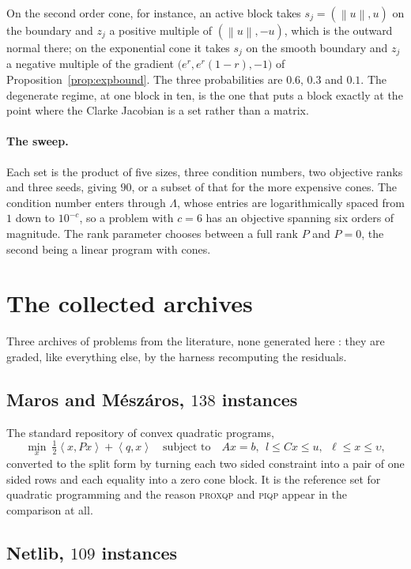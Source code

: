 \documentclass[a4paper,11pt]{book}
\theoremstyle{plain}
\theoremstyle{definition}
\theoremstyle{remark}
\numberwithin{equation}{chapter}
\numberwithin{algorithm}{chapter}
\newcommand{\norm}[1]{\left\|#1\right\|}
\newcommand{\inner}[2]{\left\langle #1, #2 \right\rangle}
\begin{document}
	On the second order cone, for instance, an active block takes
	$s_j=(\norm{u},u)$ on the boundary and $z_j$ a positive multiple of
	$(\norm{u},-u)$, which is the outward normal there; on the exponential cone
	it takes $s_j$ on the smooth boundary and $z_j$ a negative multiple of the
	gradient $\bigl(e^{r},e^{r}(1-r),-1\bigr)$ of Proposition~\ref{prop:expbound}.
	The three probabilities are $0.6$, $0.3$ and $0.1$. The degenerate regime, at
	one block in ten, is the one that puts a block
	exactly at the point where the Clarke Jacobian is a set rather than a matrix.

	\paragraph{The sweep.}
	Each set is the product of five sizes, three condition numbers, two objective
	ranks and three seeds, giving $90$, or a subset of that for the more expensive
	cones. The condition number enters through $\Lambda$, whose entries are
	logarithmically spaced from $1$ down to $10^{-c}$, so a problem with $c=6$
	has an objective spanning six orders of magnitude. The rank parameter chooses
	between a full rank $P$ and $P=0$, the second being a linear program with
	cones.

	\section{The collected archives}

	Three archives of problems from the literature, none generated here : they are graded, like everything else, by the harness
	recomputing the residuals.

	\subsection{Maros and M\'esz\'aros, $138$ instances}

	The standard repository of convex quadratic programs,
	\[
	\min_x\ \tfrac12\inner{x}{Px}+\inner{q}{x}
	\quad\text{subject to}\quad
	Ax=b,\ \ l\leq Cx\leq u,\ \ \ell\leq x\leq \upsilon ,
	\]
	converted to the split form by turning each two sided constraint into a pair
	of one sided rows and each equality into a zero cone block. It is the
	reference set for quadratic programming and the reason \textsc{proxqp} and
	\textsc{piqp} appear in the comparison at all.

	\subsection{Netlib, $109$ instances}
\end{document}
